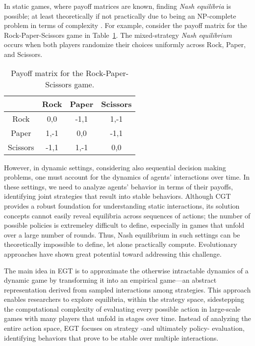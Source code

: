     \noindent
    In static games, where payoff matrices are known, finding \emph{Nash equilibria} is possible; at least theoretically if not practically due to being an NP-complete problem in terms of complexity \cite{10.5555/1714102}. For example, consider the payoff matrix for the Rock-Paper-Scissors game in Table~\ref{tab:rps_payoff}. The mixed-strategy \emph{Nash equilibrium} occurs when both players randomize their choices uniformly across Rock, Paper, and Scissors.
    \begin{table}[H]
        \centering
        \caption{Payoff matrix for the Rock-Paper-Scissors game.}
        \label{tab:rps_payoff}
        \vspace{0.5em}
        \begin{tabular}{c|c c c}
            & Rock & Paper & Scissors \\ \hline
            Rock     & 0,0    & -1,1   & 1,-1 \\
            Paper    & 1,-1   & 0,0    & -1,1 \\
            Scissors & -1,1   & 1,-1   & 0,0 \\
        \end{tabular}
    \end{table}
    
    \noindent
    However, in dynamic settings, considering also sequential decision making problems, one must account for the dynamics of agents' interactions over time. In these settings, we need to analyze agents' behavior in terms of their payoffs, identifying joint strategies that result into stable behaviors. Although CGT provides a robust foundation for understanding static interactions, its solution concepts cannot easily reveal equilibria across sequences of actions; the number of possible policies is extremeley difficult to define, especially in games that unfold over a large number of rounds. Thus, Nash equilibrium in such settings can be theoretically impossible to define, let alone practically compute. Evolutionary approaches have shown great potential toward addressing this challenge.\tinydouble

    \noindent
    The main idea in EGT is to approximate the otherwise intractable dynamics of a dynamic game by transforming it into an empirical game—an abstract representation derived from sampled interactions among strategies. This approach enables researchers to explore equilibria, within the strategy space, sidestepping the computational complexity of evaluating every possible action in large-scale games with many players that unfold in stages over time. Instead of analyzing the entire action space, EGT focuses on strategy -and ultimately policy- evaluation, identifying behaviors that prove to be stable over multiple interactions.
    
